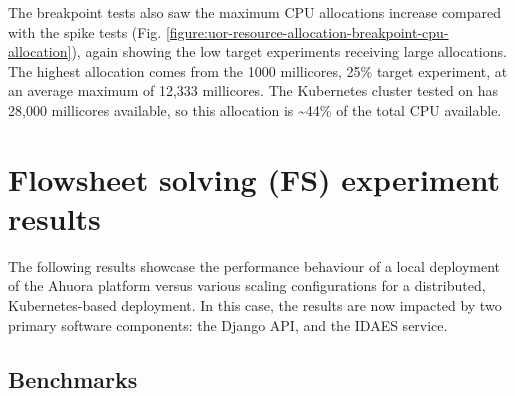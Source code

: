 The breakpoint tests also saw the maximum CPU allocations increase compared with the spike tests (Fig. \ref{figure:uor-resource-allocation-breakpoint-cpu-allocation}), again showing the low target experiments receiving large allocations. The highest allocation comes from the 1000 millicores, 25\% target experiment, at an average maximum of 12,333 millicores. The Kubernetes cluster tested on has 28,000 millicores available, so this allocation is \textasciitilde44\% of the total CPU available.

\section{Flowsheet solving (FS) experiment results}

The following results showcase the performance behaviour of a local deployment of the Ahuora platform versus various scaling configurations for a distributed, Kubernetes-based deployment. In this case, the results are now impacted by two primary software components: the Django API, and the IDAES service.

\subsection{Benchmarks}

